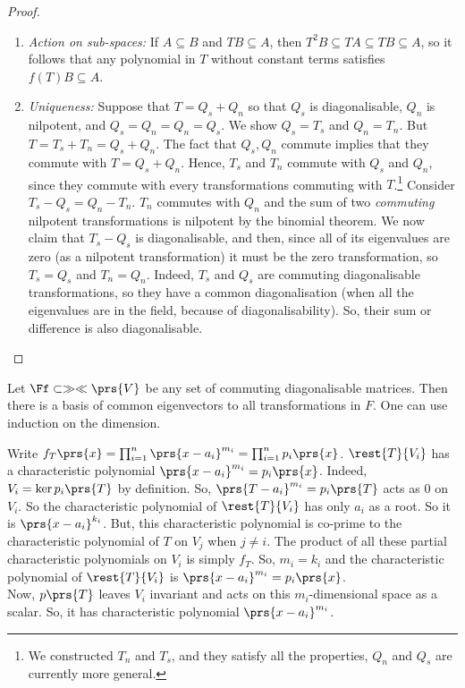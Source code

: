 \documentclass[10pt,a4paper,twoside,openany,hidelinks]{book}
\begin{document}
\begin{proof}
\begin{enumerate}[label = (\Roman*)]
\item \emph{Action on sub-spaces:} If $A \subseteq B$ and $TB \subseteq A$, then $T^2 B \subseteq TA \subseteq TB \subseteq A$, so it follows that any polynomial in $T$ without constant terms satisfies $f(T)B \subseteq A$.\\
\item \emph{Uniqueness:} Suppose that $T = Q_s + Q_n$ so that $Q_s$ is diagonalisable, $Q_n$ is nilpotent, and $Q_s = Q_n = Q_n = Q_s$. We show $Q_s = T_s$ and $Q_n = T_n$. But $T = T_s + T_n = Q_s + Q_n$. The fact that $Q_s, Q_n$ commute implies that they commute with $T = Q_s + Q_n$. Hence, $T_s$ and $T_n$ commute with $Q_s$ and $Q_n$, since they commute with every transformations commuting with $T$.\footnote{We constructed $T_n$ and $T_s$, and they satisfy all the properties, $Q_n$ and $Q_s$ are currently more general.}
Consider $T_s - Q_s = Q_n - T_n$.
$T_n$ commutes with $Q_n$ and the sum of two \emph{commuting} nilpotent transformations is nilpotent by the binomial theorem.
We now claim that $T_s - Q_s$ is diagonalisable, and then, since all of its eigenvalues are zero (as a nilpotent transformation) it must be the zero transformation, so $T_s = Q_s$ and $T_n = Q_n$.
Indeed, $T_s$ and $Q_s$ are commuting diagonalisable transformations, so they have a common diagonalisation (when all the eigenvalues are in the field, because of diagonalisability). So, their sum or difference is also diagonalisable.
\end{enumerate}
\end{proof}
\begin{exercise}
Let $\Ff \subset \gg\ll\prs{V}$ be any set of commuting diagonalisable matrices. Then there is a basis of common eigenvectors to all transformations in $F$. One can use induction on the dimension.
\end{exercise}
\begin{remark}
Write $f_T\prs{x} = \prod_{i=1}^n\prs{x- a_i}^{m_i} = \prod_{i=1}^n p_i\prs{x}$.
$\rest{T}{V_i}$ has a characteristic polynomial $\prs{x-a_i}^{m_i} = p_i\prs{x}$. Indeed, $V_i = \ker p_i\prs{T}$ by definition.
So, $\prs{T - a_i}^{m_i} = p_i\prs{T}$ acts as $0$ on $V_i$.
So the characteristic polynomial of $\rest{T}{V_i}$ has only $a_i$ as a root. So it is $\prs{x-a_i}^{k_i}$. But, this characteristic polynomial is co-prime to the characteristic polynomial of $T$ on $V_j$ when $j \neq i$. The product of all these partial characteristic polynomials on $V_i$ is simply $f_T$.
So, $m_i = k_i$ and the characteristic polynomial of $\rest{T}{V_i}$ is $\prs{x-a_i}^{m_i} = p_i\prs{x}$.\\
Now, $p\prs{T}$ leaves $V_i$ invariant and acts on this $m_i$-dimensional space as a scalar. So, it has characteristic polynomial $\prs{x-a_i}^{m_i}$.
\end{remark}
\end{document}
